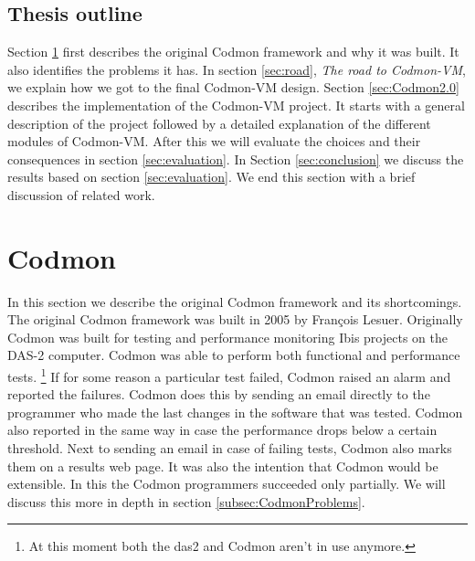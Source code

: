 \documentclass[a4paper,10pt]{scrartcl}
\newcommand{\project}{Codmon-VM}
\begin{document}
\subsection{Thesis outline}
\label{subsec:Thesisoutline}
Section \ref{sec:codmon} first describes the original Codmon framework and why it was built. It also identifies the problems it has. In section \ref{sec:road}, \emph{The road to \project{}}, 
we explain how we got to the final \project{} design. Section \ref{sec:Codmon2.0} describes the implementation of the \project{} project. 
It starts with a general description of the project followed by a detailed explanation of the different modules of \project{}. After this we will evaluate the choices and their consequences 
in section \ref{sec:evaluation}. In Section \ref{sec:conclusion} we discuss the results based on section \ref{sec:evaluation}. We end this section with a brief discussion of related work.

\newpage

\section{Codmon}
\label{sec:codmon}
In this section we describe the original Codmon framework and its shortcomings. The original Codmon framework was built in 2005 by François Lesuer\cite{Codmon}. Originally Codmon was built for 
testing and performance monitoring Ibis projects\cite{Ibis}\cite{Satin}\cite{MPJ}\cite{IPL}\cite{GMI} on the DAS-2\cite{das2} computer. Codmon was able to perform both functional and performance tests. 
\footnote{At this moment both the das2 and Codmon aren't in use anymore.} If for some reason a particular test failed, Codmon raised an alarm and reported the failures. Codmon does this by 
sending an email directly to the programmer who made the last changes in the software that was tested. Codmon also reported in the same way in case the performance drops below a certain threshold. 
Next to sending an email in case of failing tests, Codmon also marks them on a results web page. It was also the intention that Codmon would be extensible. In this the Codmon programmers 
succeeded only partially. We will discuss this more in depth in section \ref{subsec:CodmonProblems}.  
\end{document}
